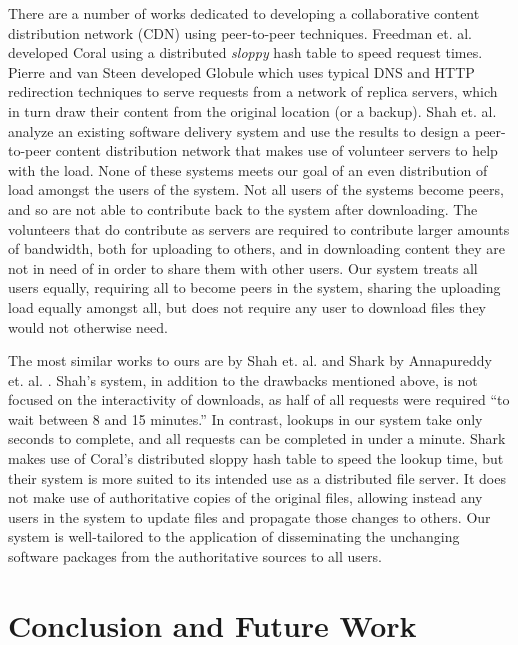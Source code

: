\documentclass[conference]{IEEEtran}
\begin{document}
There are a number of works dedicated to developing a collaborative
content distribution network (CDN) using peer-to-peer techniques.
Freedman et. al. developed Coral \cite{coral} using a distributed
\emph{sloppy} hash table to speed request times. Pierre and van
Steen developed Globule \cite{globule} which uses typical DNS and
HTTP redirection techniques to serve requests from a network of
replica servers, which in turn draw their content from the original
location (or a backup). Shah et. al. \cite{shah08} analyze an
existing software delivery system and use the results to design a
peer-to-peer content distribution network that makes use of
volunteer servers to help with the load. None of these systems meets
our goal of an even distribution of load amongst the users of the
system. Not all users of the systems become peers, and so are not
able to contribute back to the system after downloading. The
volunteers that do contribute as servers are required to contribute
larger amounts of bandwidth, both for uploading to others, and in
downloading content they are not in need of in order to share them
with other users. Our system treats all users equally, requiring all
to become peers in the system, sharing the uploading load equally
amongst all, but does not require any user to download files they
would not otherwise need.

The most similar works to ours are by Shah et. al. \cite{shah08} and
Shark by Annapureddy et. al. \cite{shark}.
Shah's system, in addition to the drawbacks mentioned above,
is not focused on the interactivity of downloads, as
half of all requests were required ``to wait between 8 and 15
minutes.'' In contrast, lookups in our system take only seconds to
complete, and all requests can be completed in under a minute.
Shark makes use of Coral's distributed sloppy hash table to speed
the lookup time, but their system is more suited to its intended use
as a distributed file server. It does not make use of authoritative
copies of the original files, allowing instead any users in the
system to update files and propagate those changes to others. Our
system is well-tailored to the application of disseminating the
unchanging software packages from the authoritative sources to all
users.



\section{Conclusion and Future Work}
\label{conclusions}
\end{document}

